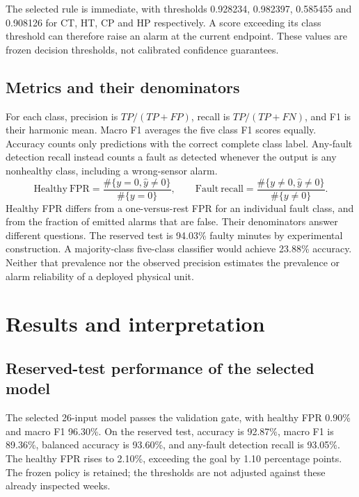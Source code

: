 The selected rule is immediate, with thresholds 0.928234, 0.982397, 0.585455 and 0.908126 for CT, HT, CP and HP respectively. A score exceeding its class threshold can therefore raise an alarm at the current endpoint. These values are frozen decision thresholds, not calibrated confidence guarantees.

\subsection{Metrics and their denominators}
For each class, precision is $TP/(TP+FP)$, recall is $TP/(TP+FN)$, and F1 is their harmonic mean. Macro F1 averages the five class F1 scores equally. Accuracy counts only predictions with the correct complete class label. Any-fault detection recall instead counts a fault as detected whenever the output is any nonhealthy class, including a wrong-sensor alarm.
\begin{equation}
\mathrm{Healthy\ FPR}=\frac{\#\{y=0,\widehat{y}\ne0\}}{\#\{y=0\}},\qquad
\mathrm{Fault\ recall}=\frac{\#\{y\ne0,\widehat{y}\ne0\}}{\#\{y\ne0\}}.
\end{equation}
Healthy FPR differs from a one-versus-rest FPR for an individual fault class, and from the fraction of emitted alarms that are false. Their denominators answer different questions. The reserved test is 94.03\% faulty minutes by experimental construction. A majority-class five-class classifier would achieve 23.88\% accuracy. Neither that prevalence nor the observed precision estimates the prevalence or alarm reliability of a deployed physical unit.

\section{Results and interpretation}
\subsection{Reserved-test performance of the selected model}
The selected 26-input model passes the validation gate, with healthy FPR 0.90\% and macro F1 96.30\%. On the reserved test, accuracy is 92.87\%, macro F1 is 89.36\%, balanced accuracy is 93.60\%, and any-fault detection recall is 93.05\%. The healthy FPR rises to 2.10\%, exceeding the goal by 1.10 percentage points. The frozen policy is retained; the thresholds are not adjusted against these already inspected weeks.

